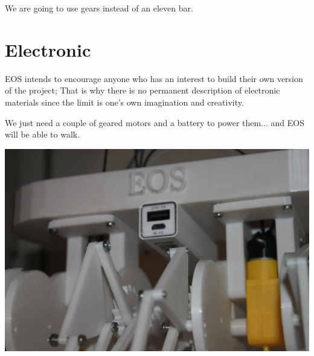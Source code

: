 \documentclass[13pt,a4paper]{article}
\begin{document}
We are going to use gears instead of an eleven bar.

\section*{Electronic}

EOS intends to encourage anyone who has an interest to build their own version of the project; That is why there is no permanent description of electronic materials since the limit is one's own imagination and creativity. \newline

\noindent We just need a couple of geared motors and a battery to power them... and EOS will be able to walk. \newline

\begin{center}
\includegraphics[scale=0.15]{"project_pictures/eos_v1_0.jpg"}
\end{center}
\end{document}
